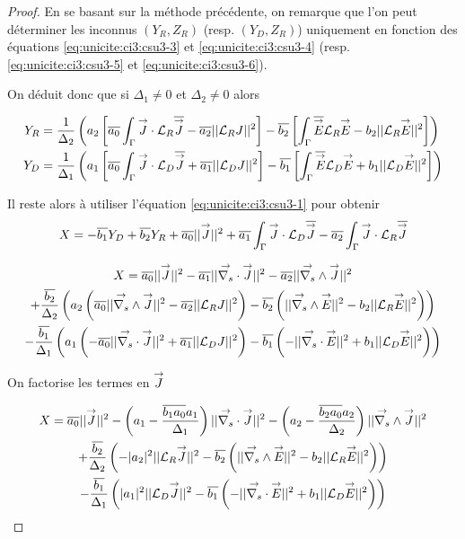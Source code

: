   \begin{proof}
    En se basant sur la méthode précédente, on remarque que l'on peut déterminer les inconnus \((Y_R,Z_R)\) (resp. \((Y_D,Z_R)\)) uniquement en fonction des équations \eqref{eq:unicite:ci3:csu3-3} et \eqref{eq:unicite:ci3:csu3-4} (resp. \eqref{eq:unicite:ci3:csu3-5} et \eqref{eq:unicite:ci3:csu3-6}).

    On déduit donc que si \(\Delta_1 \not = 0\) et \(\Delta_2 \not = 0\) alors

    \begin{align}
      Y_R &= \frac{1}{\Delta_2}\left(a_2\left[\conj{a_0}\int_\Gamma \vJ\cdot\LR\conj{\vJ} - \conj{a_2}||\LR J||^2\right]  -\conj{b_2}\left[\int_\Gamma \conj{\vE}\LR{\vE} - b_2 ||\LR \vE ||^2\right]\right) \\
      Y_D &= \frac{1}{\Delta_1}\left(a_1\left[\conj{a_0}\int_\Gamma \vJ\cdot\LD\conj{\vJ} + \conj{a_1}||\LD J||^2\right]  -\conj{b_1}\left[\int_\Gamma \conj{\vE}\LD{\vE} + b_1 ||\LD \vE ||^2\right]\right)
    \end{align}

    Il reste alors à utiliser l'équation \eqref{eq:unicite:ci3:csu3-1} pour obtenir
    \begin{equation}
      X = -\conj{b_1} Y_D + \conj{b_2} Y_R + \conj{a_0} || \vJ ||^2 + \conj{a_1} \int_\Gamma \vJ \cdot \LD \conj{\vJ} - \conj{a_2} \int_\Gamma \vJ \cdot \LR \conj{\vJ}
    \end{equation}

    \begin{multline}
      X = \conj{a_0} || \vJ ||^2 - \conj{a_1} || \vdivs \vJ ||^2 - \conj{a_2} || \vrots \vJ ||^2
      \\
      + \frac{\conj{b_2}}{\Delta_2}\left(a_2\left(\conj{a_0}||\vrots \vJ||^2 - \conj{a_2}||\LR J||^2\right)  -\conj{b_2}\left(||\vrots\vE||^2 - b_2 ||\LR \vE ||^2\right)\right)
      \\
      - \frac{\conj{b_1}}{\Delta_1}\left(a_1\left(-\conj{a_0}||\vdivs\vJ||^2 + \conj{a_1}||\LD J||^2\right)  -\conj{b_1}\left(-||\vdivs\vE||^2 + b_1 ||\LD \vE ||^2\right)\right)
    \end{multline}

    On factorise les termes en \(\vJ\)

    \begin{multline}
      X = \conj{a_0} || \vJ ||^2 - \left(a_1 - \frac{\conj{b_1a_0}a_1}{\Delta_1}\right) || \vdivs \vJ ||^2 - \left(a_2 - \frac{\conj{b_2a_0}a_2}{\Delta_2}\right) || \vrots \vJ ||^2
      \\
      + \frac{\conj{b_2}}{\Delta_2}\left( - |a_2|^2||\LR \vJ||^2  - \conj{b_2}\left(||\vrots\vE||^2 - b_2 ||\LR \vE ||^2\right)\right) 
      \\
      - \frac{\conj{b_1}}{\Delta_1}\left( |a_1|^2||\LD \vJ||^2  - \conj{b_1}\left(-||\vdivs\vE||^2 + b_1 ||\LD \vE ||^2\right)\right)
    \end{multline}


\end{proof}
